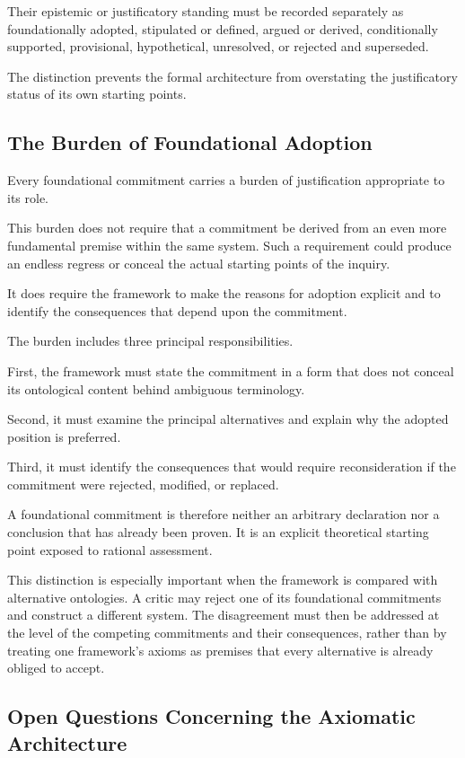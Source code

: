 Their epistemic or justificatory standing
must be recorded separately as foundationally
adopted, stipulated or defined, argued
or derived, conditionally supported,
provisional, hypothetical, unresolved,
or rejected and superseded.

The distinction prevents the formal
architecture from overstating the
justificatory status of its own
starting points.

\subsection{The Burden of Foundational Adoption}

Every foundational commitment carries
a burden of justification appropriate
to its role.

This burden does not require that
a commitment be derived from an
even more fundamental premise within
the same system. Such a requirement
could produce an endless regress
or conceal the actual starting points
of the inquiry.

It does require the framework to
make the reasons for adoption explicit
and to identify the consequences
that depend upon the commitment.

The burden includes three principal
responsibilities.

First, the framework must state
the commitment in a form that
does not conceal its ontological
content behind ambiguous terminology.

Second, it must examine the principal
alternatives and explain why the
adopted position is preferred.

Third, it must identify the consequences
that would require reconsideration
if the commitment were rejected,
modified, or replaced.

A foundational commitment is therefore
neither an arbitrary declaration
nor a conclusion that has already
been proven. It is an explicit
theoretical starting point exposed
to rational assessment.

This distinction is especially important
when the framework is compared with
alternative ontologies. A critic
may reject one of its foundational
commitments and construct a different
system. The disagreement must then
be addressed at the level of the
competing commitments and their
consequences, rather than by treating
one framework's axioms as premises
that every alternative is already
obliged to accept.

\subsection{Open Questions Concerning the Axiomatic Architecture}

